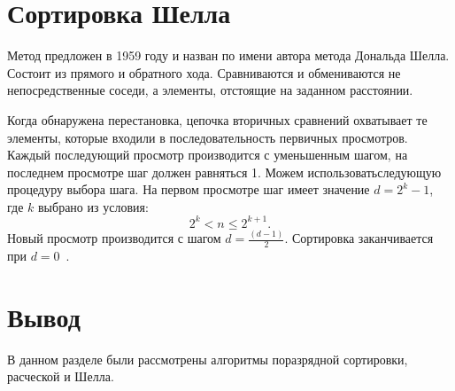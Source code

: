 \section{Сортировка Шелла}
Метод предложен в 1959 году и назван по имени автора метода Дональда Шелла.
Состоит из прямого и обратного хода. 
Сравниваются и обмениваются не непосредственные соседи, а элементы, отстоящие на заданном расстоянии. 

Когда обнаружена перестановка, цепочка вторичных сравнений охватывает те элементы, которые входили в последовательность первичных просмотров.
Каждый последующий просмотр производится с уменьшенным шагом, на последнем просмотре шаг должен равняться 1. 
Можем использоватьследующую процедуру выбора шага. 
На первом просмотре шаг имеет значение $d = 2^{k} - 1$, где $k$ выбрано из условия: \[2^{k} < n \le 2^{k + 1}.\] 
Новый просмотр производится с шагом $d = \frac{(d - 1)}{2}$. Сортировка заканчивается при $d = 0$~\cite{shell}.

\section*{Вывод}
В данном разделе были рассмотрены алгоритмы поразрядной сортировки, расческой и Шелла.